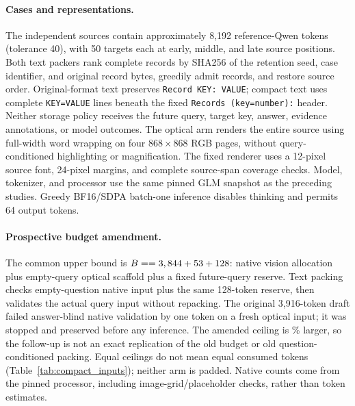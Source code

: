 \paragraph{Cases and representations.}
The  independent sources contain approximately 8,192 reference-Qwen tokens (tolerance 40), with 50 targets each at early, middle, and late source positions. Both text packers rank complete records by SHA256 of the retention seed, case identifier, and original record bytes, greedily admit records, and restore source order. Original-format text preserves \texttt{Record KEY: VALUE}; compact text uses complete \texttt{KEY=VALUE} lines beneath the fixed \texttt{Records (key=number):} header. Neither storage policy receives the future query, target key, answer, evidence annotations, or model outcomes. The optical arm renders the entire source using full-width word wrapping on four $868\times868$ RGB pages, without query-conditioned highlighting or magnification. The fixed renderer uses a 12-pixel source font, 24-pixel margins, and complete source-span coverage checks. Model, tokenizer, and processor use the same pinned GLM snapshot as the preceding studies. Greedy BF16/SDPA batch-one inference disables thinking and permits 64 output tokens.

\paragraph{Prospective budget amendment.}
The common upper bound is $B=\nval{compact.B}=3,844+53+128$: native vision allocation plus empty-query optical scaffold plus a fixed future-query reserve. Text packing checks empty-question native input plus the same 128-token reserve, then validates the actual query input without repacking. The original 3,916-token draft failed answer-blind native validation by one token on a fresh optical input; it was stopped and preserved before any inference. The amended ceiling is \% larger, so the follow-up is not an exact replication of the old budget or old question-conditioned packing. Equal ceilings do not mean equal consumed tokens (Table~\ref{tab:compact_inputs}); neither arm is padded. Native counts come from the pinned processor, including image-grid/placeholder checks, rather than token estimates.

\begin{table}[ht]\centering\small
\caption{\textbf{GLM LONG: fresh compact-storage control.} Each arm has  cases under $B=\nval{compact.B}$. Inclusion is audited record presence, not visual readability. Conditional recovery is correct among included targets. Optical omits no target; neither text arm answers an omitted target. Mean records denotes the number of complete retained records, not token coverage.}
\label{tab:compact}
\end{table}


